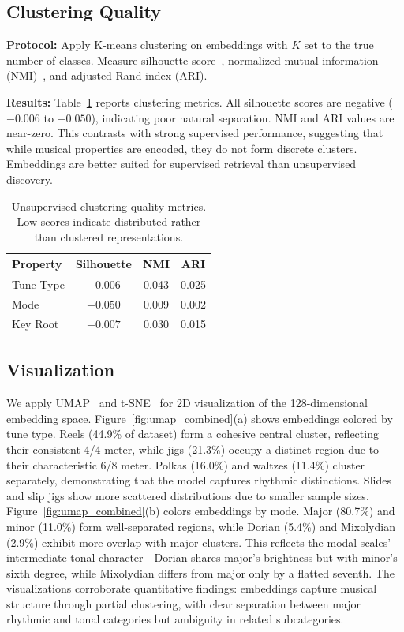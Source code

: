 \documentclass[]{interact}
\theoremstyle{plain}
\theoremstyle{definition}
\theoremstyle{remark}
\begin{document}
\subsection{Clustering Quality}

\textbf{Protocol:} Apply K-means clustering on embeddings with $K$ set to the true number of classes. Measure silhouette score~\cite{SilhouetteScore1987}, normalized mutual information (NMI)~\cite{NMI2002}, and adjusted Rand index (ARI).

\textbf{Results:} Table~\ref{tab:clustering} reports clustering metrics. All silhouette scores are negative ($-0.006$ to $-0.050$), indicating poor natural separation. NMI and ARI values are near-zero. This contrasts with strong supervised performance, suggesting that while musical properties are encoded, they do not form discrete clusters. Embeddings are better suited for supervised retrieval than unsupervised discovery.

\begin{table}[!htb]
\centering
\caption{Unsupervised clustering quality metrics. Low scores indicate distributed rather than clustered representations.}
\label{tab:clustering}
\begin{tabular}{lccc}
\toprule
\textbf{Property} & \textbf{Silhouette} & \textbf{NMI} & \textbf{ARI} \\
\midrule
Tune Type & $-0.006$ & 0.043 & 0.025 \\
Mode & $-0.050$ & 0.009 & 0.002 \\
Key Root & $-0.007$ & 0.030 & 0.015 \\
\bottomrule
\end{tabular}
\label{tab:clustering}
\end{table}

\subsection{Visualization}

We apply UMAP~\cite{UMAP2018} and t-SNE~\cite{tSNE2008} for 2D visualization of the 128-dimensional embedding space. Figure~\ref{fig:umap_combined}(a) shows embeddings colored by tune type. Reels (44.9\% of dataset) form a cohesive central cluster, reflecting their consistent 4/4 meter, while jigs (21.3\%) occupy a distinct region due to their characteristic 6/8 meter. Polkas (16.0\%) and waltzes (11.4\%) cluster separately, demonstrating that the model captures rhythmic distinctions. Slides and slip jigs show more scattered distributions due to smaller sample sizes. Figure~\ref{fig:umap_combined}(b) colors embeddings by mode. Major (80.7\%) and minor (11.0\%) form well-separated regions, while Dorian (5.4\%) and Mixolydian (2.9\%) exhibit more overlap with major clusters. This reflects the modal scales' intermediate tonal character---Dorian shares major's brightness but with minor's sixth degree, while Mixolydian differs from major only by a flatted seventh. The visualizations corroborate quantitative findings: embeddings capture musical structure through partial clustering, with clear separation between major rhythmic and tonal categories but ambiguity in related subcategories.
\end{document}
